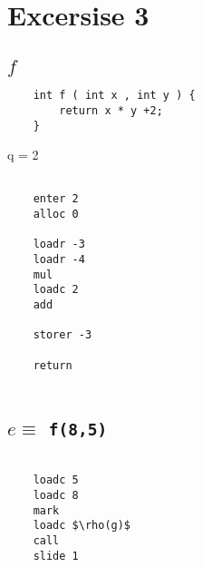 \documentclass[10pt,a4paper]{article}
\begin{document}
	\section{Excersise 3}
	
	\subsection{$f$}
	
	\begin{lstlisting}
	int f ( int x , int y ) {
		return x * y +2;
	}
	\end{lstlisting}
	
	q = 2
	
	\begin{lstlisting}[mathescape]
	
	enter 2
	alloc 0
	
	loadr -3
	loadr -4
	mul
	loadc 2
	add
	
	storer -3
	
	return
	
	\end{lstlisting}
	
	\subsection{$e \equiv$ \texttt{f(8,5)}}
	
	\begin{lstlisting}[mathescape]
	
	loadc 5
	loadc 8
	mark
	loadc $\rho(g)$
	call
	slide 1
	
	\end{lstlisting}
\end{document}
